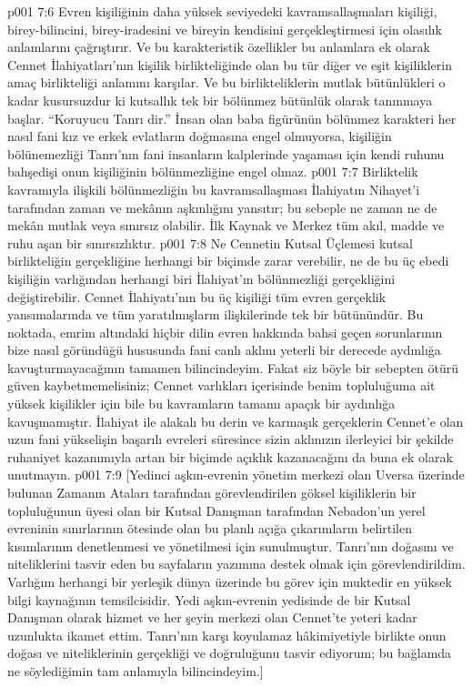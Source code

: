 \vs p001 7:6 Evren kişiliğinin daha yüksek seviyedeki kavramsallaşmaları kişiliği, birey\hyp{}bilincini, birey\hyp{}iradesini ve bireyin kendisini gerçekleştirmesi için olasılık anlamlarını çağrıştırır. Ve bu karakteristik özellikler bu anlamlara ek olarak Cennet İlahiyatları’nın kişilik birlikteliğinde olan bu tür diğer ve eşit kişiliklerin amaç birlikteliği anlamını karşılar. Ve bu birlikteliklerin mutlak bütünlükleri o kadar kusursuzdur ki kutsallık tek bir bölünmez bütünlük olarak tanınmaya başlar. “Koruyucu Tanrı dir.” İnsan olan baba figürünün bölünmez karakteri her nasıl fani kız ve erkek evlatların doğmasına engel olmuyorsa, kişiliğin bölünemezliği Tanrı’nın fani insanların kalplerinde yaşaması için kendi ruhunu bahşedişi onun kişiliğinin bölünmezliğine engel olmaz.
\vs p001 7:7 Birliktelik kavramıyla ilişkili bölünmezliğin bu kavramsallaşması İlahiyatın Nihayet’i tarafından zaman ve mekânın aşkınlığını yansıtır; bu sebeple ne zaman ne de mekân mutlak veya sınırsız olabilir. İlk Kaynak ve Merkez tüm akıl, madde ve ruhu aşan bir sınırsızlıktır.
\vs p001 7:8 Ne Cennetin Kutsal Üçlemesi kutsal birlikteliğin gerçekliğine herhangi bir biçimde zarar verebilir, ne de bu üç ebedi kişiliğin varlığından herhangi biri İlahiyat’ın bölünmezliği gerçekliğini değiştirebilir. Cennet İlahiyatı’nın bu üç kişiliği tüm evren gerçeklik yansımalarında ve tüm yaratılmışların ilişkilerinde tek bir bütünündür. Bu noktada, emrim altındaki hiçbir dilin evren hakkında bahsi geçen sorunlarının bize nasıl göründüğü hususunda fani canlı aklını yeterli bir derecede aydınlığa kavuşturmayacağının tamamen bilincindeyim. Fakat siz böyle bir sebepten ötürü güven kaybetmemelisiniz; Cennet varlıkları içerisinde benim topluluğuma ait yüksek kişilikler için bile bu kavramların tamamı apaçık bir aydınlığa kavuşmamıştır. İlahiyat ile alakalı bu derin ve karmaşık gerçeklerin Cennet’e olan uzun fani yükselişin başarılı evreleri süresince sizin aklınızın ilerleyici bir şekilde ruhaniyet kazanımıyla artan bir biçimde açıklık kazanacağını da buna ek olarak unutmayın.
\vs p001 7:9 [Yedinci aşkın\hyp{}evrenin yönetim merkezi olan Uversa üzerinde bulunan Zamanın Ataları tarafından görevlendirilen göksel kişiliklerin bir topluluğunun üyesi olan bir Kutsal Danışman tarafından Nebadon’un yerel evreninin sınırlarının ötesinde olan bu planlı açığa çıkarımların belirtilen kısımlarının denetlenmesi ve yönetilmesi için sunulmuştur. Tanrı’nın doğasını ve niteliklerini tasvir eden bu sayfaların yazımına destek olmak için görevlendirildim. Varlığım herhangi bir yerleşik dünya üzerinde bu görev için muktedir en yüksek bilgi kaynağının temsilcisidir. Yedi aşkın\hyp{}evrenin yedisinde de bir Kutsal Danışman olarak hizmet ve her şeyin merkezi olan Cennet’te yeteri kadar uzunlukta ikamet ettim. Tanrı’nın karşı koyulamaz hâkimiyetiyle birlikte onun doğası ve niteliklerinin gerçekliği ve doğruluğunu tasvir ediyorum; bu bağlamda ne söylediğimin tam anlamıyla bilincindeyim.]
